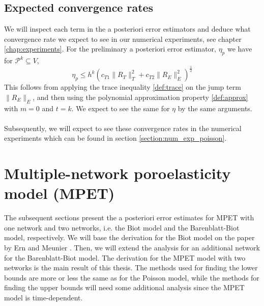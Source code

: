 \subsection{Expected convergence rates} \label{poisson_expected_rates}
We will inspect each term in the a posteriori error estimators and deduce what convergence rate we expect to see in our numerical experiments, see chapter \ref{chap:experiments}. For the preliminary a posteriori error estimator, $\eta_p$ we have for $\mathcal{P}^k \subseteq V$,
\begin{equation}
\eta_p \leq h^{k}\left(c_{T1}\| R_T\|^2_T + c_{T2}\| R_E \|^2_E\right)^\frac{1}{2}
\end{equation}
This follows from applying the trace inequality \ref{def:trace} on the jump term $\| R_E \|_E$, and then using the polynomial approximation property \ref{def:approx} with $m=0$ and $t=k$. We expect to see the same for $\eta$ by the same arguments. 
\\
\\
Subsequently, we will expect to see these convergence rates in the numerical experiments which can be found in section  \ref{section:num_exp_poisson}. 
\section{Multiple-network poroelasticity model (MPET)} \label{section:error_mpet}
The subsequent sections present the a posteriori error estimates for MPET with one network and two networks, i.e. the Biot model and the Barenblatt-Biot model, respectively. We will base the derivation for the Biot model on the paper by Ern and Meunier \cite{meunier}. Then, we will extend the analysis for an additional network for the Barenblatt-Biot model. The derivation for the MPET model with two networks is the main result of this thesis. The methods used for finding the lower bounds are more or less the same as for the Poisson model, while the methods for finding the upper bounds will need some additional analysis since the MPET model is time-dependent. 


